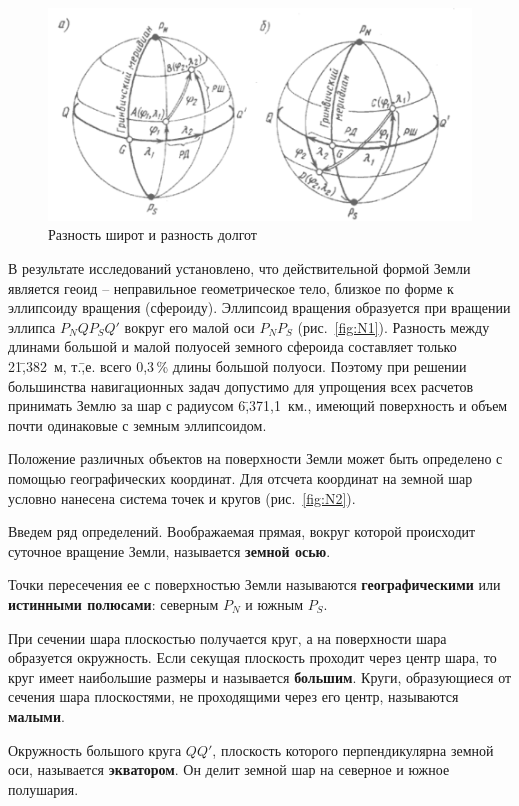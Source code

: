 \documentclass[a4paper, 12pt, twoside, final, book, russian, fittopage, cyremdash]{ncc}
\newcommand{\ris}[1]{\ref{fig:#1}}
\begin{document}
\begin{figure}[htb]
  \centering{}
  \includegraphics{N003}
  \caption{Разность широт и разность долгот}
  \label{fig:N3}
\end{figure}

В результате исследований установлено, что действительной формой Земли является геоид \--- неправильное геометрическое тело, близкое по форме к эллипсоиду вращения (сфероиду). Эллипсоид вращения образуется при вращении эллипса $P_NQP_SQ'$ вокруг его малой оси $P_NP_S$ (рис.~\ris{N1}). Разность между длинами большой и малой полуосей земного сфероида составляет только 21\=,382~м, т.\=,е. всего 0,3\,\% длины большой полуоси. Поэтому при решении большинства навигационных задач допустимо для упрощения всех расчетов принимать Землю за шар с радиусом 6\=,371,1~км., имеющий поверхность и объем почти одинаковые с земным эллипсоидом. 

Положение различных объектов на поверхности Земли может быть определено с помощью географических координат. Для отсчета координат на земной шар условно нанесена система точек и кругов (рис.~\ris{N2}). 

Введем ряд определений. Воображаемая прямая, вокруг которой происходит суточное вращение Земли, называется \textbf{земной осью}.

Точки пересечения ее с поверхностью Земли называются \textbf{географическими} или \textbf{истинными полюсами}: северным $P_N$ и южным $P_S$.

При сечении шара плоскостью получается круг, а на поверхности шара образуется окружность. Если секущая плоскость проходит через центр шара, то круг имеет наибольшие размеры и называется \textbf{большим}. Круги, образующиеся от сечения шара плоскостями, не проходящими через его центр, называются \textbf{малыми}. 

Окружность большого круга $QQ'$, плоскость которого перпендикулярна земной оси, называется \textbf{экватором}. Он делит земной шар на северное и южное полушария. 
\end{document}
